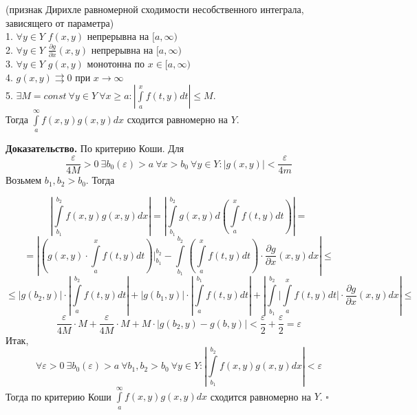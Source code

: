 \begin{theor}
    (признак Дирихле равномерной сходимости несобственного интеграла, 
    зависящего от параметра)\\
    1. $\forall y\in Y$ $f(x,y)$ непрерывна на  $[a,\infty)$\\
    2. $\forall y\in Y$ $\frac{\partial g}{\partial x}(x,y)$ 
    непрерывна на  $[a,\infty)$\\
    3. $\forall y\in Y$ $g(x,y)$ монотонна по $x\in [a,\infty)$\\
    4. $g(x,y)\rightrightarrows 0$ при $x\to \infty$\\
    5. $\exists M=const~\forall y\in Y~\forall x\geqslant a:
    \left| \int\limits_{a}^{x}f(t,y)dt \right|\leqslant M$.\\
    Тогда $\int\limits_{a}^{\infty}f(x,y)g(x,y)dx$ сходится равномерно на
    $Y$.
\end{theor}
\textbf{Доказательство.}  По критерию Коши. 
Для
$$\frac{\varepsilon}{4M}>0~\exists b_0(\varepsilon)>a~\forall x>b_0~
\forall y\in Y:|g(x,y)|<\frac{\varepsilon}{4m}$$ 
Возьмем $b_1,b_2>b_0$. Тогда

\begin{equation*}
\left| \int\limits_{b_1}^{b_2}f(x,y)g(x,y)dx \right| = 
\left| \int\limits_{b_1}^{b_2}g(x,y)d\left( \int\limits_{a}^{x}f(t,y)dt
\right)   \right| = 
\end{equation*}
$$=\left|\left( g(x,y)\cdot\int\limits_{a}^{x}f(t,y)dt\right)\bigg|^{b_2}_{b_1}
- \int\limits_{b_1}^{b_2} \left( \int\limits_{a}^{x} f(t,y)dt \right) \cdot 
\frac{\partial g}{\partial x} (x,y)dx \right|\leqslant$$
$$\leqslant 
\left| g(b_2,y) \right|\cdot \left| \int\limits_{a}^{b_2}f(t,y)dt \right| +
\left| g(b_1,y) \right|\cdot \left| \int\limits_{a}^{b_1}f(t,y)dt \right| +
\left| \int\limits_{b_1}^{b_2}\biggl| \int\limits_{a}^{x}f(t,y)dt\biggr|\cdot 
\frac{\partial g}{\partial x} (x,y)dx \right| \leqslant $$ 
$$\frac{\varepsilon}{4M}\cdot M+\frac{\varepsilon}{4M}\cdot M+
M\cdot |g(b_2,y)-g(b,y)|<\frac{\varepsilon}{2}+\frac{\varepsilon}{2}=
\varepsilon$$ 
Итак, 
$$\forall \varepsilon>0~\exists b_0(\varepsilon)>a~\forall b_1,b_2>b_0~
\forall y\in Y:\left| \int\limits_{b_1}^{b_2}f(x,y)g(x,y)dx\right| 
<\varepsilon$$ 
Тогда по 
критерию Коши $\int\limits_{a}^{\infty}f(x,y)g(x,y)dx$ сходится равномерно на
$Y$. $\square$ 

